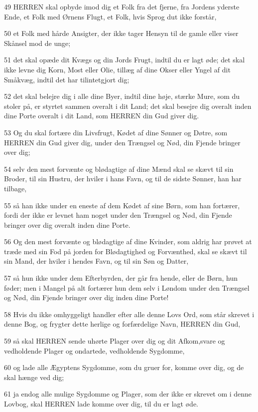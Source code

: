 \par 49 HERREN skal opbyde imod dig et Folk fra det fjerne, fra Jordens yderste Ende, et Folk med Ørnens Flugt, et Folk, hvis Sprog dut ikke forstår,
\par 50 et Folk med hårde Ansigter, der ikke tager Hensyn til de gamle eller viser Skånsel mod de unge;
\par 51 det skal opæde dit Kvægs og din Jords Frugt, indtil du er lagt øde; det skal ikke levne dig Korn, Most eller Olie, tillæg af dine Okser eller Yngel af dit Småkvæg, indtil det har tilintetgjort dig;
\par 52 det skal belejre dig i alle dine Byer, indtil dine høje, stærke Mure, som du stoler på, er styrtet sammen overalt i dit Land; det skal besejre dig overalt inden dine Porte overalt i dit Land, som HERREN din Gud giver dig.
\par 53 Og du skal fortære din Livsfrugt, Kødet af dine Sønner og Døtre, som HERREN din Gud giver dig, under den Trængsel og Nød, din Fjende bringer over dig;
\par 54 selv den mest forvænte og blødagtige af dine Mænd skal se skævt til sin Broder, til sin Hustru, der hviler i hans Favn, og til de sidste Sønner, han har tilbage,
\par 55 så han ikke under en eneste af dem Kødet af sine Børn, som han fortærer, fordi der ikke er levnet ham noget under den Trængsel og Nød, din Fjende bringer over dig overalt inden dine Porte.
\par 56 Og den mest forvænte og blødagtige af dine Kvinder, som aldrig har prøvet at træde med sin Fod på jorden for Blødagtighed og Forvænthed, skal se skævt til sin Mand, der hviler i hendes Favn, og til sin Søn og Datter,
\par 57 så hun ikke under dem Efterbyrden, der går fra hende, eller de Børn, hun føder; men i Mangel på alt fortærer hun dem selv i Løndom under den Trængsel og Nød, din Fjende bringer over dig inden dine Porte!
\par 58 Hvis du ikke omhyggeligt handler efter alle denne Lovs Ord, som står skrevet i denne Bog, og frygter dette herlige og forfærdelige Navn, HERREN din Gud,
\par 59 så skal HERREN sende uhørte Plager over dig og dit Afkom,svare og vedholdende Plager og ondartede, vedholdende Sygdomme,
\par 60 og lade alle Ægyptens Sygdomme, som du gruer for, komme over dig, og de skal hænge ved dig;
\par 61 ja endog alle mulige Sygdomme og Plager, som der ikke er skrevet om i denne Lovbog, skal HERREN lade komme over dig, til du er lagt øde.
